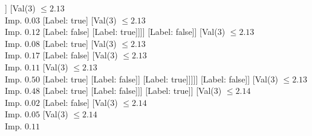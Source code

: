 \documentclass[margin=10pt]{standalone}
\begin{document}
\begin{forest}
																[Val($3$) $ \leq 2.14$ \\ Imp. $0.00$
																	[Val($3$) $ \leq 2.13$ \\ Imp. $0.00$
																		[Label: false]
																		[Val($3$) $ \leq 2.13$ \\ Imp. $0.01$
																			[Val($3$) $ \leq 2.13$ \\ Imp. $0.03$
																				[Val($3$) $ \leq 2.13$ \\ Imp. $0.01$
																					[Val($3$) $ \leq 2.13$ \\ Imp. $0.02$
																						[Val($3$) $ \leq 2.13$ \\ Imp. $0.05$
																							[Val($3$) $ \leq 2.13$ \\ Imp. $0.03$
																								[Val($3$) $ \leq 2.13$ \\ Imp. $0.03$
																									[Val($3$) $ \leq 2.13$ \\ Imp. $0.09$
																										[Label: true]
																										[Label: false]]
																									[Val($3$) $ \leq 2.13$ \\ Imp. $0.03$
																										[Label: true]
																										[Val($3$) $ \leq 2.13$ \\ Imp. $0.12$
																											[Label: false]
																											[Label: true]]]]
																								[Label: false]]
																							[Val($3$) $ \leq 2.13$ \\ Imp. $0.08$
																								[Label: true]
																								[Val($3$) $ \leq 2.13$ \\ Imp. $0.17$
																									[Label: false]
																									[Val($3$) $ \leq 2.13$ \\ Imp. $0.11$
																										[Val($3$) $ \leq 2.13$ \\ Imp. $0.50$
																											[Label: true]
																											[Label: false]]
																										[Label: true]]]]]
																						[Label: false]]
																					[Val($3$) $ \leq 2.13$ \\ Imp. $0.48$
																						[Label: true]
																						[Label: false]]]
																				[Label: true]]
																			[Val($3$) $ \leq 2.14$ \\ Imp. $0.02$
																				[Label: false]
																				[Val($3$) $ \leq 2.14$ \\ Imp. $0.05$
																					[Val($3$) $ \leq 2.14$ \\ Imp. $0.11$

\end{forest}
\end{document}
